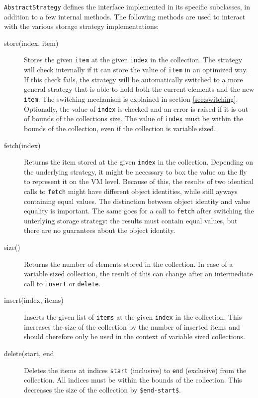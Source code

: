 \lstinline{AbstractStrategy} defines the interface implemented in its specific subclasses, in addition to a few internal methods.
The following methods are used to interact with the various storage strategy implementations:
\begin{description}
\item[store(index, item)]{Stores the given \lstinline{item} at the given \lstinline{index} in the collection. 
The strategy will check internally if it can store the value of \lstinline{item} in an optimized way.
If this check fails, the strategy will be automatically switched to a more general strategy that is able to hold both the current elements and the new \lstinline{item}.
The switching mechanism is explained in section \ref{sec:switching}.
Optionally, the value of \lstinline{index} is checked and an error is raised if it is out of bounds of the collections size.
The value of \lstinline{index} must be within the bounds of the collection, even if the collection is variable sized.
}
\item[fetch(index)]{Returns the item stored at the given \lstinline{index} in the collection.
Depending on the underlying strategy, it might be necessary to box the value on the fly to represent it on the VM level.
Because of this, the results of two identical calls to \lstinline{fetch} might have different object identities, while still ayways containing equal values.
The distinction between object identity and value equality is important.
The same goes for a call to \lstinline{fetch} after switching the unterlying storage strategy: the results must contain equal values, but there are no guarantees about the object identity.
}
\item[size()]{Returns the number of elements stored in the collection.
In case of a variable sized collection, the result of this can change after an intermediate call to \lstinline{insert} or \lstinline{delete}.}
\item[insert(index, items)]{Inserts the given list of \lstinline{items} at the given \lstinline{index} in the collection.
This increases the size of the collection by the number of inserted items and should therefore only be used in the context of variable sized collections.}
\item[delete(start, end]{Deletes the items at indices \lstinline{start} (inclusive) to \lstinline{end} (exclusive) from the collection.
All indices must be within the bounds of the collection.
This decreases the size of the collection by \lstinline{$end-start$}.}
\end{description}

